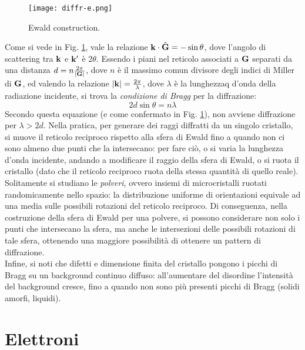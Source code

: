 \begin{figure}
	\centering
	\texttt{[image: diffr-e.png]}
	\caption{Ewald construction.}
	\label{diffr-e}
\end{figure}

Come si vede in Fig. \ref{diffr-e}, vale la relazione $ \mathbf{k} \cdot \hat{\mathbf{G}} = - \sin \theta $, dove l'angolo di scattering tra $ \mathbf{k} $ e $ \mathbf{k}' $ è $ 2\theta $. Essendo i piani nel reticolo associati a $ \mathbf{G} $ separati da una distanza $ d = n \frac{2\pi}{\left\lvert\mathbf{G}\right\rvert} $, dove $ n $ è il massimo comun divisore degli indici di Miller di $ \mathbf{G} $, ed valendo la relazione $ \left\lvert\mathbf{k}\right\rvert = \frac{2\pi}{\lambda} $, dove $ \lambda $ è la lunghezzaq d'onda della radiazione incidente, si trova la \textit{condizione di Bragg} per la diffrazione:
\begin{equation}
	2 d \sin \theta = n \lambda
\end{equation}
Secondo questa equazione (e come confermato in Fig. \ref{diffr-e}), non avviene diffrazione per $ \lambda > 2d $. Nella pratica, per generare dei raggi diffratti da un singolo cristallo, si muove il reticolo reciproco rispetto alla sfera di Ewald fino a quando non ci sono almeno due punti che la intersecano: per fare ciò, o si varia la lunghezza d'onda incidente, andando a modificare il raggio della sfera di Ewald, o si ruota il cristallo (dato che il reticolo reciproco ruota della stessa quantità di quello reale). \\
Solitamente si studiano le \textit{polveri}, ovvero insiemi di microcristalli ruotati randomicamente nello spazio: la distribuzione uniforme di orientazioni equivale ad una media sulle possibili rotazioni del reticolo reciproco. Di conseguenza, nella costruzione della sfera di Ewald per una polvere, si possono considerare non solo i punti che intersecano la sfera, ma anche le intersezioni delle possibili rotazioni di tale sfera, ottenendo una maggiore possibilità di ottenere un pattern di diffrazione. \\
Infine, si noti che difetti e dimensione finita del cristallo pongono i picchi di Bragg su un background continuo diffuso: all'aumentare del disordine l'intensità del background cresce, fino a quando non sono più presenti picchi di Bragg (solidi amorfi, liquidi).

\section{Elettroni}

